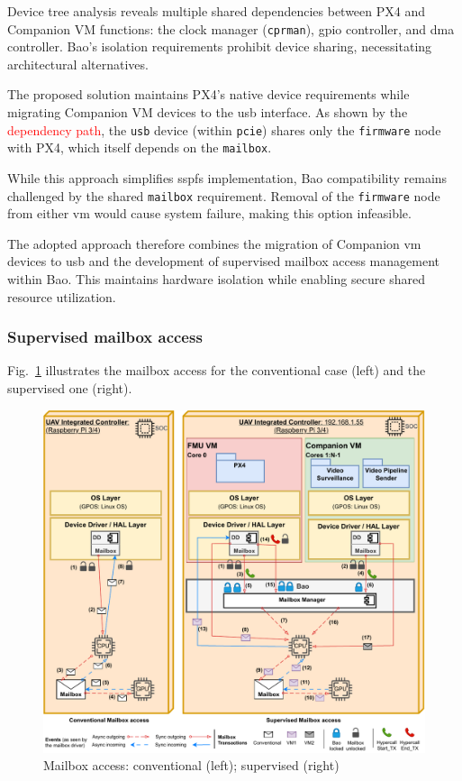Device tree analysis reveals multiple shared dependencies between PX4 and Companion VM functions: the clock manager (\lstinline{cprman}), \gls{gpio} controller, and \gls{dma} controller. Bao's isolation requirements prohibit device sharing, necessitating architectural alternatives.

The proposed solution maintains PX4's native device requirements while migrating Companion VM devices to the \gls{usb} interface. As shown by the \textcolor{red}{dependency path}, the \lstinline{usb} device (within \lstinline{pcie}) shares only the \lstinline{firmware} node with PX4, which itself depends on the \lstinline{mailbox}.

While this approach simplifies \gls{sspfs} implementation, Bao compatibility remains challenged by the shared \lstinline{mailbox} requirement. Removal of the \lstinline{firmware} node from either \gls{vm} would cause system failure, making this option infeasible.

The adopted approach therefore combines the migration of Companion \gls{vm}
devices to \gls{usb} and the development of supervised mailbox access management within Bao.
This maintains hardware isolation while enabling secure shared resource utilization.

\subsubsection{Supervised mailbox access}
\label{sec:superv-mailb-access}
Fig.~\ref{fig:design-mailbox} illustrates the mailbox access for the
conventional case (left) and the supervised one (right).

\begin{figure}[!hbt]
  \centering
  \includegraphics[width=1.0\textwidth]{./img/pdf/uav-main-design-mailbox} 
  \caption{Mailbox access: conventional (left); supervised (right)}%
  \label{fig:design-mailbox}
\end{figure}


